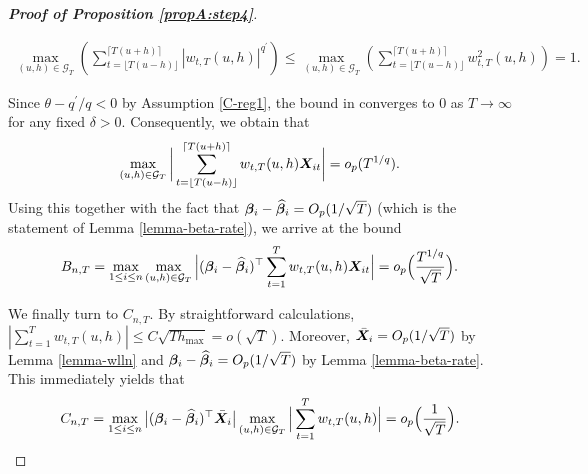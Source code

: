 \documentclass[12pt]{article}
\makeatletter
\renewcommand{\eqref}[1]{\tagform@{\ref{#1}}}
\makeatother
\begin{document}
\begin{proof}[\textnormal{\textbf{Proof of Proposition \ref{propA:step4}}}]
\begin{enumerate}[label=(\roman*),leftmargin=0.85cm]
\begin{align*}
\max_{(u, h) \in \mathcal{G}_T} \left( \sum_{t=\lfloor T(u-h) \rfloor}^{\lceil T(u+h) \rceil} |w_{t,T}(u,h)|^{q^\prime}\right) \leq
\max_{(u, h) \in \mathcal{G}_T} \left( \sum_{t=\lfloor T(u-h) \rfloor}^{\lceil T(u+h) \rceil} w_{t,T}^2(u,h)\right) =1.
\end{align*}
\end{enumerate}
Since $\theta - q^\prime/q <0$ by Assumption \ref{C-reg1}, the bound in \eqref{eq:exp-bound-BnT} converges to $0$ as $T \to \infty$ for any fixed $\delta >0$. Consequently, we obtain that
\begin{align}\label{ineq-diff-9}
\max_{(u, h) \in \mathcal{G}_T} \bigg| \sum_{t=\lfloor T(u-h) \rfloor}^{\lceil T(u+h) \rceil} w_{t,T}(u,h)\boldsymbol{X}_{it}  \bigg| = o_p(T^{1/q}).
\end{align}
Using this together with the fact that $\bm{\beta}_i - \widehat{\bm{\beta}}_i = O_p(1/\sqrt{T})$ (which is the statement of Lemma \ref{lemma-beta-rate}), we arrive at the bound 
\[ B_{n,T} = \max_{1 \le i \le n} \max_{(u,h) \in \mathcal{G}_T} \Big| (\bm{\beta}_i - \widehat{\bm{\beta}}_i)^\top\sum_{t=1}^T w_{t,T}(u,h) \boldsymbol{X}_{it} \Big| = o_p\Big(\frac{T^{1/q}}{\sqrt{T}}\Big). \]


We finally turn to $C_{n,T}$. By straightforward calculations, $| \sum_{t=1}^T w_{t,T}(u,h) | \le C \sqrt{T h_{\max}} = o(\sqrt{T})$. 
Moreover, $\bar{\boldsymbol{X}}_i = O_p(1/\sqrt{T})$ by Lemma \ref{lemma-wlln} and $\bm{\beta}_i - \widehat{\bm{\beta}}_i = O_p(1/\sqrt{T})$ by Lemma \ref{lemma-beta-rate}. This immediately yields that
\[ C_{n,T} = \max_{1\le i  \le n}\big|(\bm{\beta}_i - \widehat{\bm{\beta}}_i)^\top\bar{\boldsymbol{X}}_{i}\big| \max_{(u,h) \in \mathcal{G}_T}  \Big| \sum_{t=1}^T w_{t,T}(u,h)  \Big| = o_p\Big(\frac{1}{\sqrt{T}}\Big). \]



\end{proof}
\end{document}

